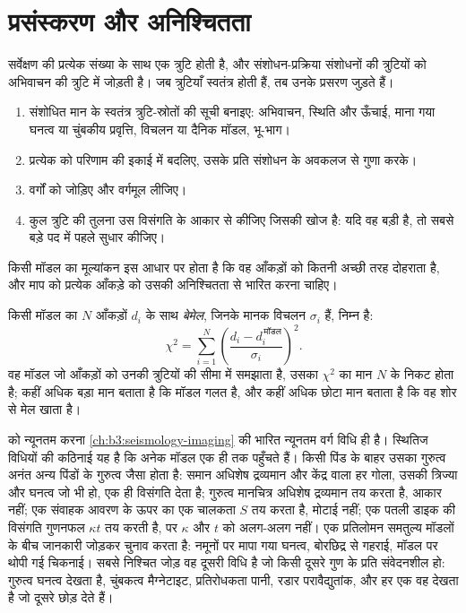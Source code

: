 \section{प्रसंस्करण और अनिश्चितता}\label{sec:b3:field-lab-methods-3:processing}

सर्वेक्षण की प्रत्येक संख्या के साथ एक त्रुटि होती है, और संशोधन-प्रक्रिया
संशोधनों की त्रुटियों को अभिवाचन की त्रुटि में जोड़ती है। जब त्रुटियाँ
स्वतंत्र होती हैं, तब उनके प्रसरण जुड़ते हैं।

\begin{method}[त्रुटि-बजट]\label{met:b3:field-lab-methods-3:budget}
\begin{enumerate}
  \item संशोधित मान के स्वतंत्र त्रुटि-स्रोतों की सूची बनाइए: अभिवाचन,
        स्थिति और ऊँचाई, माना गया घनत्व या चुंबकीय प्रवृत्ति,
        विचलन या दैनिक मॉडल, भू-भाग।
  \item प्रत्येक को परिणाम की इकाई में बदलिए, उसके प्रति संशोधन के
        अवकलज से गुणा करके।
  \item वर्गों को जोड़िए और वर्गमूल लीजिए।
  \item कुल त्रुटि की तुलना उस विसंगति के आकार से कीजिए जिसकी खोज है: यदि वह
        बड़ी है, तो सबसे बड़े पद में पहले सुधार कीजिए।
\end{enumerate}
\end{method}

किसी मॉडल का मूल्यांकन इस आधार पर होता है कि वह आँकड़ों को कितनी अच्छी तरह दोहराता है, और माप
को प्रत्येक आँकड़े को उसकी अनिश्चितता से भारित करना चाहिए।

\begin{definition}[आँकड़ा बेमेल]\label{def:b3:field-lab-methods-3:inversion-practice}
किसी मॉडल का $N$ आँकड़ों $d_i$ के साथ \emph{बेमेल},
जिनके मानक विचलन $\sigma_i$ हैं, निम्न है:
\[
\chi^2 = \sum_{i=1}^N\left(\frac{d_i - d_i^{\,\text{मॉडल}}}{\sigma_i}\right)^2 .
\]
वह मॉडल जो आँकड़ों को उनकी त्रुटियों की सीमा में समझाता है, उसका $\chi^2$ का मान
$N$ के निकट होता है; कहीं अधिक बड़ा मान बताता है कि मॉडल गलत है, और कहीं अधिक छोटा मान
बताता है कि वह शोर से मेल खाता है।
\end{definition}

 को न्यूनतम करना
\cref{ch:b3:seismology-imaging} की भारित न्यूनतम वर्ग विधि ही है। स्थितिज
विधियों की कठिनाई यह है कि अनेक मॉडल एक ही  तक पहुँचते हैं। किसी पिंड के बाहर
उसका गुरुत्व अनंत अन्य पिंडों के गुरुत्व जैसा होता है:
समान अधिशेष द्रव्यमान और केंद्र वाला हर गोला, उसकी त्रिज्या और
घनत्व जो भी हो, एक ही विसंगति देता है; गुरुत्व मानचित्र अधिशेष द्रव्यमान तय करता है, आकार नहीं; एक
संवाहक आवरण के ऊपर का एक  चालकता $S$ तय करता है, मोटाई
नहीं; एक पतली डाइक की विसंगति गुणनफल $\kappa t$ तय करती है,
पर $\kappa$ और $t$ को अलग-अलग नहीं। एक प्रतिलोमन समतुल्य मॉडलों के बीच
जानकारी जोड़कर चुनाव करता है: नमूनों पर मापा गया घनत्व,
बोरछिद्र से गहराई, मॉडल पर थोपी गई चिकनाई। सबसे निश्चित
जोड़ वह दूसरी विधि है जो किसी दूसरे गुण के प्रति संवेदनशील हो: गुरुत्व घनत्व देखता है,
चुंबकत्व मैग्नेटाइट, प्रतिरोधकता पानी, रडार परावैद्युतांक, और
हर एक वह देखता है जो दूसरे छोड़ देते हैं।

